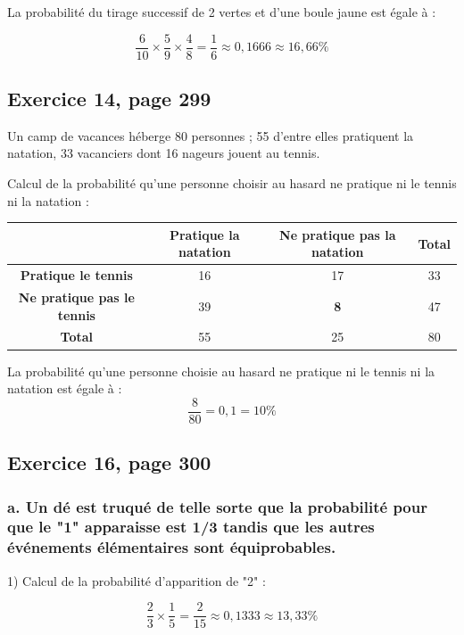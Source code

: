 \documentclass[10pt]{article}
\begin{document}
\hspace{13pt}La probabilité du tirage successif de 2 vertes et d'une boule jaune est égale à :

$$\frac{6}{10}\times \frac{5}{9}\times \frac{4}{8}=\frac{1}{6}\approx 0,1666\approx 16,66\%$$\vspace{0,1cm}


\subsection*{Exercice 14, page 299}
Un camp de vacances héberge 80 personnes ; 55 d'entre elles pratiquent la natation, 33 vacanciers dont 16 nageurs jouent au tennis.\vspace{2pt}

Calcul de la probabilité qu'une personne choisir au hasard ne pratique ni le tennis ni la natation :

\begin{center}
\begin{tabular}{ |c|c|c|c| } 
 \hline
 & \textbf{Pratique la natation} & \textbf{Ne pratique pas la natation} & \textbf{Total} \\ 
 \hline
 \textbf{Pratique le tennis} & 16 & 17 & 33\\
 \hline
 \textbf{Ne pratique pas le tennis} & 39 & \textbf{8} & 47\\ 
 \hline
 \textbf{Total} & 55 & 25 & 80\\
 \hline
\end{tabular}
\end{center}

\hspace{13pt}La probabilité qu'une personne choisie au hasard ne pratique ni le tennis ni la natation est égale à :
$$\frac{8}{80}=0,1=10\%$$

\subsection*{Exercice 16, page 300}
\subsubsection*{a. Un dé est truqué de telle sorte que la probabilité pour que le "1" apparaisse est 1/3 tandis que les autres événements élémentaires sont équiprobables.}

\hspace{15pt}1) Calcul de la probabilité d'apparition de "2" :

$$\frac{2}{3} \times \frac{1}{5}=\frac{2}{15}\approx 0,1333 \approx 13,33\%$$
\end{document}
